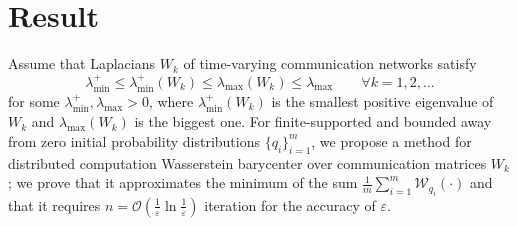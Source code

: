 \section{Result}

Assume that Laplacians $W_k$ of time-varying communication networks satisfy 
\[\lambda_{\min}^{+} \leq \lambda_{\min}^{+}({W}_k) \leq \lambda_{\max}({W}_k) \leq \lambda_{\max} \qquad \forall k=1,2,\ldots\]
for some $\lambda_{\min}^{+}, \lambda_{\max}>0$, where $\lambda_{\min}^{+}({W}_k)$ is the smallest positive eigenvalue of $W_k$ and $\lambda_{\max}({W}_k)$ is the biggest one.
For finite-supported and bounded away from zero initial probability distributions $\{q_i\}_{i=1}^{m}$,
we propose a method for distributed computation Wasserstein barycenter over communication matrices $W_k$; we prove that it approximates the minimum of the sum $\frac{1}{m}\sum\limits_{i=1}^{m}  \mathcal{W}_{q_i}(\cdot)$ and that it requires $n=\mathcal{O}\left(\frac{1}{\varepsilon}\ln \frac{1}{\varepsilon}\right)$ iteration for the accuracy  of $\varepsilon$.



